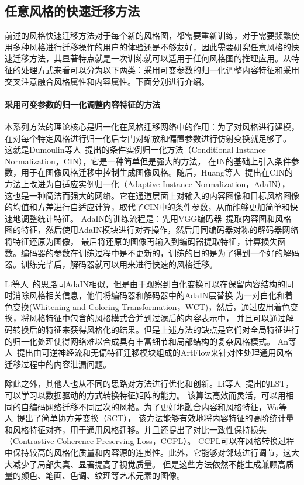 \subsection{任意风格的快速迁移方法}
前述的风格快速迁移方法对于每个新的风格图，都需要重新训练，对于需要频繁使用多种风格进行迁移操作的用户的体验还是不够友好，因此需要研究任意风格的快速迁移方法，其显著特点就是一次训练就可以适用于任何风格图的推理应用。从特征的处理方式来看可以分为以下两类：采用可变参数的归一化调整内容特征和采用交叉注意融合风格属性和内容属性。下面分别进行介绍。
\paragraph{采用可变参数的归一化调整内容特征的方法}
本系列方法的理论核心是归一化在风格迁移网络中的作用：为了对风格进行建模，在对每个特定风格进行归一化后专门对缩放和偏置参数进行仿射变换就足够了。
这就是Dumoulin等人~\cite{dumoulin2016learned,ghiasi2017exploring}提出的条件实例归一化方法（Conditional Instance Normalization，CIN），它是一种简单但是强大的方法，
在IN的基础上引入条件参数，用于在图像风格迁移中控制生成图像风格。随后，Huang等人~\cite{huang2017arbitrary}提出在CIN的方法上改进为自适应实例归一化（Adaptive Instance Normalization，AdaIN），
这也是一种简洁而强大的网络。它在通道层面上对输入的内容图像和目标风格图像的均值和方差进行自适应计算，取代了CIN中的条件参数，从而能够更加简单和快速地调整统计特征。
AdaIN的训练流程是：先用VGG编码器~\cite{simonyan2015very}提取内容图和风格图的特征，然后使用AdaIN模块进行对齐操作，然后用同编码器对称的解码器网络将特征还原为图像，
最后将还原的图像再输入到编码器提取特征，计算损失函数。编码器的参数在训练过程中是不更新的，训练的目的是为了得到一个好的解码器。训练完毕后，解码器就可以用来进行快速的风格迁移。
\par Li等人~\cite{li2017universal}的思路同AdaIN相似，但是由于观察到白化变换可以在保留内容结构的同时消除风格相关信息，他们将编码器和解码器中的AdaIN层替换
为一对白化和着色变换(Whitening and Coloring Transformation，WCT)，然后，通过应用着色变换，将风格特征中包含的风格模式合并到过滤后的内容表示中，
并且可以通过解码转换后的特征来获得风格化的结果。但是上述方法的缺点是它们对全局特征进行的归一化处理使得网络难以合成具有丰富细节和局部结构的复杂风格模式。
An等人~\cite{an2021artflow}提出由可逆神经流和无偏特征迁移模块组成的ArtFlow来针对性处理通用风格迁移过程中的内容泄漏问题。
\par 除此之外，其他人也从不同的思路对方法进行优化和创新。Li等人~\cite{li2019learning}提出的LST，可以学习以数据驱动的方式转换特征矩阵的能力。
该算法高效而灵活，可以用相同的自编码网络迁移不同层次的风格。为了更好地融合内容和风格特征，Wu等人~\cite{wu2022ccpl}提出了简单协方差变换（SCT），
该方法能够有效地将内容特征的高阶统计量和风格特征对齐，用于通用风格迁移。并且还提出了对比一致性保持损失（Contrastive Coherence Preserving Loss，CCPL）。
CCPL可以在风格转换过程中保持较高的风格化质量和内容源的连贯性。此外，它能够对邻域进行调节，这大大减少了局部失真、显著提高了视觉质量。
但是这些方法依然不能生成兼顾高质量的颜色、笔画、色调、纹理等艺术元素的图像。

